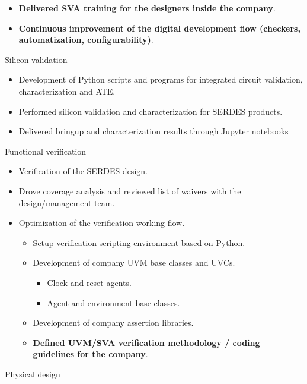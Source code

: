 \begin{cventries}
{\begin{cvitems}
\begin{itemize}
\begin{itemize}
            \item {\textbf{Delivered SVA training for the designers inside the company}.}
            \item {\textbf{Continuous improvement of the digital development flow (checkers, automatization, configurability)}.}
          \end{itemize}
        \end{itemize}
        \item {Silicon validation}
          \begin{itemize}
            \item {Development of Python scripts and programs for integrated circuit validation, characterization and ATE.}
            \item {Performed silicon validation and characterization for SERDES products.}
            \item {Delivered bringup and characterization results through Jupyter notebooks}
          \end{itemize}
        \item {Functional verification}
        \begin{itemize}
          \item {Verification of the SERDES design.}
          \item {Drove coverage analysis and reviewed list of waivers with the design/management team.}
          \item {Optimization of the verification working flow.}
          \begin{itemize}
            \item {Setup verification scripting environment based on Python.}
            \item {Development of company UVM base classes and UVCs.}
              \begin{itemize}
                \item {Clock and reset agents.}
                \item {Agent and environment base classes.}
              \end{itemize}
            \item {Development of company assertion libraries.}
            \item {\textbf{Defined UVM/SVA verification methodology / coding guidelines for the company}.}
          \end{itemize}
        \end{itemize}
        \item {Physical design}

\end{cvitems}}
\end{cventries}
